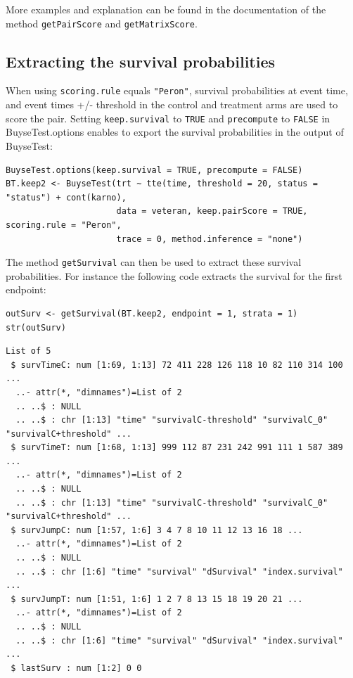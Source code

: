 \documentclass[12pt]{article}
\begin{document}
\bigskip

More examples and explanation can be found in the documentation of the
method \texttt{getPairScore} and \texttt{getMatrixScore}.

\subsection{Extracting the survival probabilities}
\label{sec:org4217088}
When using \texttt{scoring.rule} equals \texttt{"Peron"}, survival probabilities at
event time, and event times +/- threshold in the control and treatment
arms are used to score the pair. Setting \texttt{keep.survival} to \texttt{TRUE} and
\texttt{precompute} to \texttt{FALSE} in BuyseTest.options enables to export the
survival probabilities in the output of BuyseTest:
\lstset{language=r,label= ,caption= ,captionpos=b,numbers=none}
\begin{lstlisting}
BuyseTest.options(keep.survival = TRUE, precompute = FALSE)
BT.keep2 <- BuyseTest(trt ~ tte(time, threshold = 20, status = "status") + cont(karno),
                      data = veteran, keep.pairScore = TRUE, scoring.rule = "Peron",
                      trace = 0, method.inference = "none")
\end{lstlisting}

The method \texttt{getSurvival} can then be used to extract these survival
probabilities. For instance the following code extracts the survival
for the first endpoint:
\lstset{language=r,label= ,caption= ,captionpos=b,numbers=none}
\begin{lstlisting}
outSurv <- getSurvival(BT.keep2, endpoint = 1, strata = 1)
str(outSurv)
\end{lstlisting}

\begin{verbatim}
List of 5
 $ survTimeC: num [1:69, 1:13] 72 411 228 126 118 10 82 110 314 100 ...
  ..- attr(*, "dimnames")=List of 2
  .. ..$ : NULL
  .. ..$ : chr [1:13] "time" "survivalC-threshold" "survivalC_0" "survivalC+threshold" ...
 $ survTimeT: num [1:68, 1:13] 999 112 87 231 242 991 111 1 587 389 ...
  ..- attr(*, "dimnames")=List of 2
  .. ..$ : NULL
  .. ..$ : chr [1:13] "time" "survivalC-threshold" "survivalC_0" "survivalC+threshold" ...
 $ survJumpC: num [1:57, 1:6] 3 4 7 8 10 11 12 13 16 18 ...
  ..- attr(*, "dimnames")=List of 2
  .. ..$ : NULL
  .. ..$ : chr [1:6] "time" "survival" "dSurvival" "index.survival" ...
 $ survJumpT: num [1:51, 1:6] 1 2 7 8 13 15 18 19 20 21 ...
  ..- attr(*, "dimnames")=List of 2
  .. ..$ : NULL
  .. ..$ : chr [1:6] "time" "survival" "dSurvival" "index.survival" ...
 $ lastSurv : num [1:2] 0 0
\end{verbatim}
\end{document}
